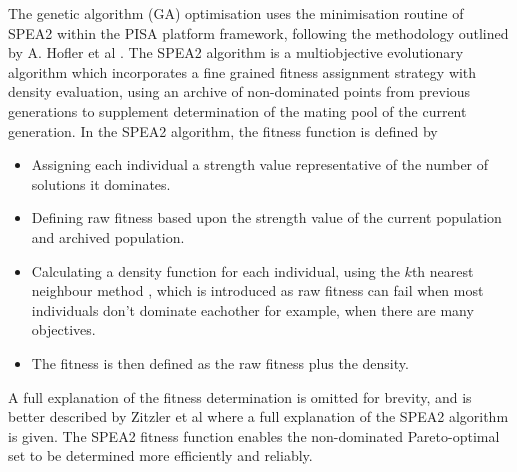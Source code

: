 \documentclass[../main.tex]{subfiles}
\begin{document}
The genetic algorithm (GA) optimisation uses the minimisation routine of \textsc{SPEA2} \cite{zitzler2001spea2} within the \textsc{PISA} platform \cite{bleuler2003pisa} framework, following the methodology outlined by A. Hofler et al \cite{hofler2013innovative}. The \textsc{SPEA2} algorithm is a multiobjective evolutionary algorithm which incorporates a fine grained fitness assignment strategy \cite{zitzler2001spea2} with density evaluation, using an archive of non-dominated points from previous generations to supplement determination of the mating pool of the current generation. In the \textsc{SPEA2} algorithm, the fitness function is defined by
\begin{itemize}
    \item{Assigning each individual a strength value representative of the number of solutions it dominates.}
    \item{Defining raw fitness based upon the strength value of the current population and archived population.}
    \item{Calculating a density function for each individual, using the $k$th nearest neighbour method \cite{silverman1986density}, which is introduced as raw fitness can fail when most individuals don't dominate eachother for example, when there are many objectives.}
    \item{The fitness is then defined as the raw fitness plus the density.}
\end{itemize}
A full explanation of the fitness determination is omitted for brevity, and is better described by Zitzler et al \cite{zitzler2001spea2} where a full explanation of the \textsc{SPEA2} algorithm is given. The \textsc{SPEA2} fitness function enables the non-dominated Pareto-optimal set to be determined more efficiently and reliably.
\end{document}
